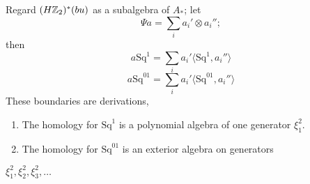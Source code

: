 \documentclass[../main]{subfiles}
\begin{document}
Regard $(H\mathbb{Z}_2)^{\ast}(bu)$ as a subalgebra of $A_{\ast}$; let \begin{equation}
    \Psi a = \sum_{i}a_{i}'\otimes a_{i}'';
\end{equation}
then \begin{equation*}
    a\mathrm{Sq}^{1}=\sum_{i}a_{i}'\langle\mathrm{Sq}^{1},a_{i}''\rangle 
\end{equation*}
\begin{equation*}
    a\mathrm{Sq}^{01}=\sum_{i}a_{i}'\langle\mathrm{Sq}^{01},a_{i}''\rangle 
\end{equation*}
These boundaries are derivations, 
\begin{customlemma}{16.9}\begin{enumerate}[label=(\roman*)] \label{lem:p3ch16.9}
    \item The homology for $\mathrm{Sq}^{1}$ is a polynomial algebra of one generator $\xi_{1}^{2}$.\\
    \item The homology for $\mathrm{Sq}^{01}$ is an exterior algebra on generators
\end{enumerate} 
 $\xi_{1}^{2},\xi_{2}^{2},\xi_{3}^{2},\dots$
 
\end{customlemma}
\end{document}
